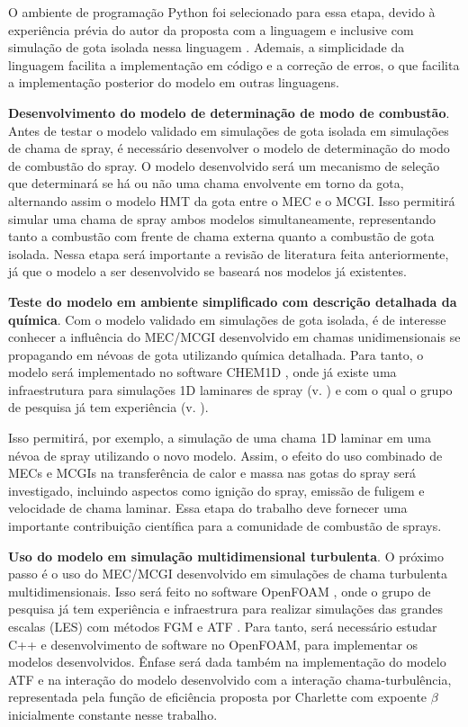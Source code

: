 O ambiente de programação Python foi selecionado para essa etapa, devido à experiência prévia do autor da proposta com a linguagem e inclusive com simulação de gota isolada nessa linguagem \cite{HenningsJ2024MT}.
Ademais, a simplicidade da linguagem facilita a implementação em código e a correção de erros, o que facilita a implementação posterior do modelo em outras linguagens.

\textbf{Desenvolvimento do modelo de determinação de modo de combustão}.
Antes de testar o modelo validado em simulações de gota isolada em simulações de chama de spray, é necessário desenvolver o modelo de determinação do modo de combustão do spray.
O modelo desenvolvido será um mecanismo de seleção que determinará se há ou não uma chama envolvente em torno da gota, alternando assim o modelo HMT da gota entre o MEC e o MCGI.
Isso permitirá simular uma chama de spray ambos modelos simultaneamente, representando tanto a combustão com frente de chama externa quanto a combustão de gota isolada.
Nessa etapa será importante a revisão de literatura feita anteriormente, já que o modelo a ser desenvolvido se baseará nos modelos já existentes.


\textbf{Teste do modelo em ambiente simplificado com descrição detalhada da química}.
Com o modelo validado em simulações de gota isolada, é de interesse conhecer a influência do MEC/MCGI desenvolvido em chamas unidimensionais se propagando em névoas de gota utilizando química detalhada.
Para tanto, o modelo será implementado no software CHEM1D \cite{Sommers1994PhD}, onde já existe uma infraestrutura para simulações 1D laminares de spray (v. \cite{Sommers1994PhD,vanOijen2002CTM,vanOijen2016PECS, SacomanoF2018CTM,SacomanoF2021Fluids}) e com o qual o grupo de pesquisa já tem experiência (v. \cite{SacomanoF2018CTM,SacomanoF2019IJHMT,SacomanoF2021Fluids,SacomanoF2024CF,SacomanoF2025CF}).

Isso permitirá, por exemplo, a simulação de uma chama 1D laminar em uma névoa de spray utilizando o novo modelo.
Assim, o efeito do uso combinado de MECs e MCGIs na transferência de calor e massa nas gotas do spray será investigado, incluindo aspectos como ignição do spray, emissão de fuligem e velocidade de chama laminar.
Essa etapa do trabalho deve fornecer uma importante contribuição científica para a comunidade de combustão de sprays.


\textbf{Uso do modelo em simulação multidimensional turbulenta}.
O próximo passo é o uso do MEC/MCGI desenvolvido em simulações de chama turbulenta multidimensionais.
Isso será feito no software OpenFOAM \cite{JasakOpenFOAM}, onde o grupo de pesquisa já tem experiência e infraestrura para realizar simulações das grandes escalas (LES) com métodos FGM e ATF \cite{SacomanoF2017PhD,SacomanoF2017CF,SacomanoF2020CF}.
Para tanto, será necessário estudar C++ e desenvolvimento de software no OpenFOAM, para implementar os modelos desenvolvidos.
Ênfase será dada também na implementação do modelo ATF e na interação do modelo desenvolvido com a interação chama-turbulência, representada pela função de eficiência proposta por Charlette \cite{CharletteF2002} com expoente $\beta$ inicialmente constante nesse trabalho. 

